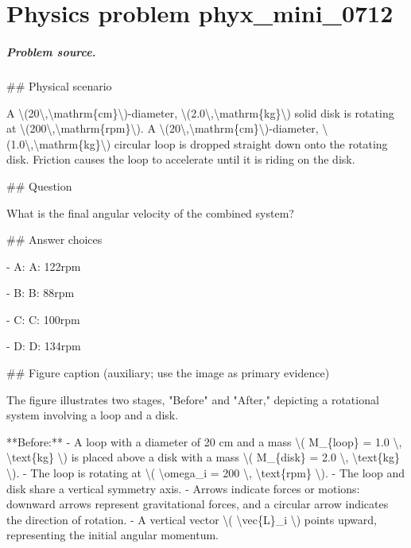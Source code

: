 
\chapter{Physics problem phyx\_mini\_0712}
\label{ch:PhyXMiniProblems_problem_phyx_mini_0712}

\paragraph{Problem source.}
\#\# Physical scenario

A \textbackslash{}(20\textbackslash{},\textbackslash{}mathrm\{cm\}\textbackslash{})-diameter, \textbackslash{}(2.0\textbackslash{},\textbackslash{}mathrm\{kg\}\textbackslash{}) solid disk is rotating at \textbackslash{}(200\textbackslash{},\textbackslash{}mathrm\{rpm\}\textbackslash{}). A \textbackslash{}(20\textbackslash{},\textbackslash{}mathrm\{cm\}\textbackslash{})-diameter, \textbackslash{}(1.0\textbackslash{},\textbackslash{}mathrm\{kg\}\textbackslash{}) circular loop is dropped straight down onto the rotating disk. Friction causes the loop to accelerate until it is riding on the disk.

\#\# Question

What is the final angular velocity of the combined system?

\#\# Answer choices

- A: A: 122rpm

- B: B: 88rpm

- C: C: 100rpm

- D: D: 134rpm

\#\# Figure caption (auxiliary; use the image as primary evidence)

The figure illustrates two stages, "Before" and "After," depicting a rotational system involving a loop and a disk.

**Before:**
- A loop with a diameter of 20 cm and a mass \textbackslash{}( M\_\{loop\} = 1.0 \textbackslash{}, \textbackslash{}text\{kg\} \textbackslash{}) is placed above a disk with a mass \textbackslash{}( M\_\{disk\} = 2.0 \textbackslash{}, \textbackslash{}text\{kg\} \textbackslash{}).
- The loop is rotating at \textbackslash{}( \textbackslash{}omega\_i = 200 \textbackslash{}, \textbackslash{}text\{rpm\} \textbackslash{}).
- The loop and disk share a vertical symmetry axis.
- Arrows indicate forces or motions: downward arrows represent gravitational forces, and a circular arrow indicates the direction of rotation.
- A vertical vector \textbackslash{}( \textbackslash{}vec\{L\}\_i \textbackslash{}) points upward, representing the initial angular momentum.

